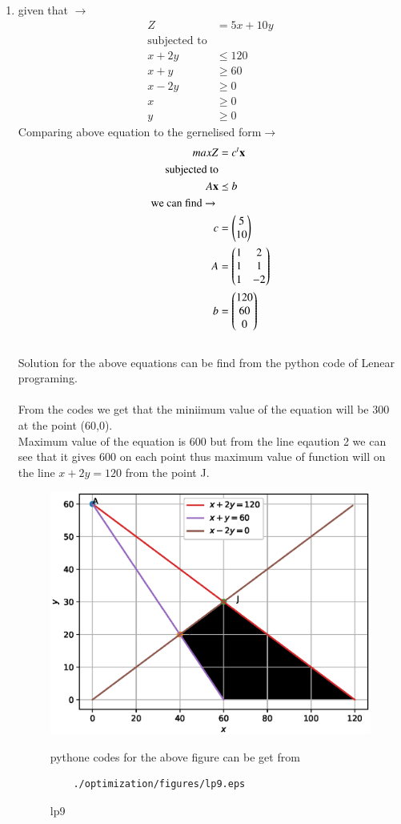\renewcommand{\theequation}{\theenumi}
\begin{enumerate}[label=\arabic*.,ref=\thesubsection.\theenumi]
\item  given that $\to$
\begin{align}
Z &= 5x + 10y
\\
\text{subjected to}
\\
x + 2y &\leq 120
\\
x + y &\geq 60
\\
x - 2y &\geq 0
\\
x  &\geq 0
\\
y &\geq 0
\end{align}
Comparing above equation to the gernelised form$\to$ 
\begin{align}
maxZ &= c^t \mathbf{x}
\\
\text{subjected to}
\\
A\mathbf{x} &\preceq b
\\ 
\text{we can find $\to$ }
\\
c &= \begin{pmatrix}5\\ 10\end{pmatrix}
\\
A &= \begin{pmatrix}1 & 2\\1 & 1 \\ 1 & -2\end{pmatrix}
\\
b &= \begin{pmatrix}120\\60\\0\end{pmatrix}
\end{align}\\
Solution for the above equations can be find from the python code of Lenear programing.\\
\\
From the codes we get that the miniimum value of the equation will be 300 at the point (60,0).
\\
Maximum value of the equation is 600 but from the line  eqaution 2 we can see that  it gives 600 on each point thus maximum value of function will on the line  $x+2y = 120$ from the point J.

\begin{figure}[!ht]
	\centering
	\includegraphics[width=\columnwidth]{./figures/lp9.eps}
	\caption{ lp9}
	\label{fig:lp9}
	pythone codes for the above figure can be get from
	\begin{lstlisting}
	./optimization/figures/lp9.eps
	\end{lstlisting}	
\end{figure}
\end{enumerate}